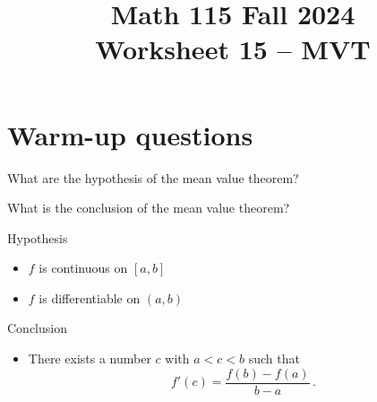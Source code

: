 \documentclass[11pt]{exam}
\title{\vspace{-1in} Math 115 Fall 2024 \\ Worksheet 15 -- MVT}
\date{}
\begin{document}
\maketitle
\vspace{-1in}

\section*{Warm-up questions}
\noindent
What are the hypothesis of the mean value theorem?

\vspace{3em}
\noindent
What is the conclusion of the mean value theorem?
\vspace{3em}
\begin{solution}
 Hypothesis
 \begin{itemize}
 \item \(f\) is continuous on \([a,b]\)
 \item \(f\) is differentiable on \((a,b)\)
 \end{itemize}
 Conclusion 
 \begin{itemize}
 \item There exists a number \(c\) with \(a < c < b\) such that \[
     f'(c) = \frac{f(b)-f(a)}{b-a} \,.
   \]
 \end{itemize}
\end{solution}
\end{document}
